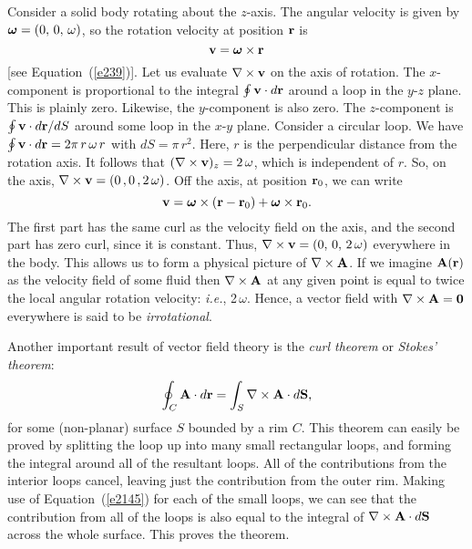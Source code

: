 Consider a solid body rotating about the $z$-axis. The angular velocity is given
by $\mbox{\boldmath$\omega$} = (0,\,0,\,\omega)$, so  the rotation velocity at
position ${\bf r}$ is
\begin{equation}
{\bf v} = \mbox{\boldmath$\omega$}\times {\bf r}
\end{equation}
[see Equation~(\ref{e239})].
Let us evaluate $\nabla\times{\bf v}$ on the axis of
rotation. The $x$-component is proportional to the
integral $\oint {\bf v}\cdot d{\bf r}$ around a loop in the $y$-$z$ plane. This is
plainly zero. Likewise, the $y$-component is also zero. The $z$-component
is $\oint {\bf v}\cdot d{\bf r}/ dS$ around some loop in the $x$-$y$ plane. 
Consider a circular loop. We have $\oint {\bf v}\cdot d{\bf r} = 2\pi \,r \,\omega \,r$ 
with $dS = \pi \,r^2$. 
Here, $r$ is the perpendicular distance from the rotation axis.
It follows that $(\nabla\times {\bf v})_z = 2\,\omega$, which
is independent of $r$. So, on the axis, $\nabla\times{\bf v} = (0\,,0\,,2\,\omega)$.
Off the axis, at position ${\bf r}_0$, we can write
\begin{equation}
{\bf v} = \mbox{\boldmath$\omega$}\times ({\bf r}-{\bf r}_0) + 
\mbox{\boldmath$\omega$}\times {\bf r}_0.
\end{equation}
The first part has the same curl as the velocity field on the axis, and the
second part has zero curl, since it is constant. Thus, 
$\nabla\times{\bf v} = (0,\,0,\,2\,\omega)$ everywhere in the body. This allows us to
form a physical picture of $\nabla\times{\bf A}$. If we imagine ${\bf A}({\bf r})$ as the
velocity field of some fluid then $\nabla\times{\bf A}$ at any given point is equal
to twice the local angular rotation velocity: 
{\em i.e.},  2\,\mbox{\boldmath$\omega$}. 
Hence, a vector field with $\nabla\times{\bf A} ={\bf  0}$ everywhere is said to
be {\em irrotational}.

Another important  result of vector field theory is the {\em curl theorem}
or {\em Stokes' theorem}:
\begin{equation}
\oint_C {\bf A} \cdot d{\bf r} = \int_S \nabla\times{\bf A}\cdot d{\bf S},
\end{equation}
for some (non-planar) surface $S$ bounded by a rim $C$. This theorem can easily
be proved by splitting the loop up into many small rectangular loops, and forming
the integral around all of the resultant loops. All of the contributions from the
interior loops cancel, leaving just the contribution from the outer rim. 
Making use of Equation~(\ref{e2145}) for each of the small loops, we can see that the contribution
from all of the loops is also equal to the  integral of $\nabla\times{\bf A}
\cdot d{\bf S}$ across the whole surface. This proves the theorem.

